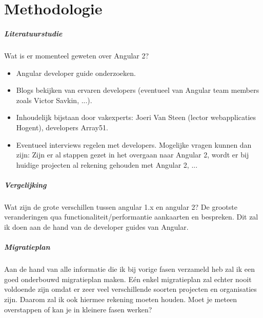 \documentclass[pdftex,a4paper,12pt,twoside]{report}
\begin{document}
\chapter{Methodologie}
\label{ch:methodologie}

\paragraph{Literatuurstudie}
\leavevmode
\newline
Wat is er momenteel geweten over Angular 2?
\begin{itemize}
    	\item Angular developer guide onderzoeken.
	\item Blogs bekijken van ervaren developers (eventueel van Angular team members zoals Victor Savkin, ...).
	\item Inhoudelijk bijstaan door vakexperts: Joeri Van Steen (lector webapplicaties Hogent), developers Array51.
	\item Eventueel interviews regelen met developers. Mogelijke vragen kunnen dan zijn: \newline Zijn er al stappen gezet in het overgaan naar Angular 2, wordt er bij huidige projecten al rekening gehouden met Angular 2, ...
	
\end{itemize}
 
\paragraph{Vergelijking} 
\leavevmode
\newline
Wat zijn de grote verschillen tussen angular 1.x en angular 2? De grootste veranderingen qua functionaliteit/performantie aankaarten en bespreken.
Dit zal ik doen aan de hand van de developer guides van Angular.
\paragraph{Migratieplan} 
\leavevmode
\newline
Aan de hand van alle informatie die ik bij vorige fasen verzameld heb zal ik een goed onderbouwd migratieplan maken. E\'en enkel migratieplan zal echter nooit voldoende zijn omdat er zeer veel verschillende soorten projecten en organisaties zijn. Daarom zal ik ook hiermee rekening moeten houden. Moet je meteen overstappen of kan je in kleinere fasen werken? 
\end{document}
